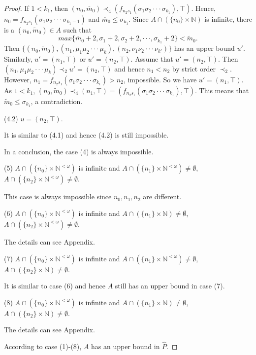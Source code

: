 \documentclass[10pt,a4paper]{amsart}
\begin{document}
\begin{proof}
If $1<k_{1}$, then $(n_{0},\overline{m}_{0})\prec_{4}(f_{n_{2}s_{1}}(\sigma_{1}\sigma_{2}\cdot\cdot\cdot\sigma_{k_{1}}),\top)$. Hence, $n_{0}=f_{n_{2}s_{1}}(\sigma_{1}\sigma_{2}\cdot\cdot\cdot\sigma_{k_{1}-1})$ and $\overline{m}_{0}\leq\sigma_{k_{1}}$. Since $A\cap(\{n_{0}\}\times\mathbb{N})$ is infinite, there is a $(n_{0},\widetilde{m}_{0})\in A$ such that $$max\{\overline{m}_{0}+2,\sigma_{1}+2,\sigma_{2}+2,\cdot\cdot\cdot,\sigma_{k_{1}}+2\}<\widetilde{m}_{0}.$$
Then $\{(n_{0},\widetilde{m}_{0}),(n_{1},\mu_{1}\mu_{2}\cdot\cdot\cdot\mu_{k}),(n_{2},\nu_{1}\nu_{2}\cdot\cdot\cdot\nu_{k'})\}$ has an upper bound $u'$. Similarly, $u'=(n_{1},\top)$ or $u'=(n_{2},\top)$. Assume that $u'=(n_{2},\top)$. Then $(n_{1},\mu_{1}\mu_{2}\cdot\cdot\cdot\mu_{k})\prec_{2}u'=(n_{2},\top)$ and hence $n_{1}< n_{2}$ by strict order $\prec_{2}$. However, $n_{1}=f_{n_{2}s_{1}}(\sigma_{1}\sigma_{2}\cdot\cdot\cdot\sigma_{k_{1}})>n_{2}$, impossible. So we have $u'=(n_{1},\top)$. As $1<k_{1}$, $(n_{0},\widetilde{m}_{0})\prec_{4}(n_{1},\top)=(f_{n_{2}s_{1}}(\sigma_{1}\sigma_{2}\cdot\cdot\cdot\sigma_{k_{1}}),\top)$. This means that $\widetilde{m}_{0}\leq\sigma_{k_{1}}$, a contradiction.

(4.2) $u=(n_{2},\top)$.

It is similar to (4.1) and hence (4.2) is still impossible.

In a conclusion, the case (4) is always impossible.

(5) $A\cap(\{n_{0}\}\times\mathbb{N}^{<\omega})$ is infinite and $A\cap(\{n_{1}\}\times\mathbb{N}^{<\omega})\neq\emptyset$, $A\cap(\{n_{2}\}\times\mathbb{N}^{<\omega})\neq\emptyset$.

This case is always impossible since $n_{0},n_{1},n_{2}$ are different.

(6) $A\cap(\{n_{0}\}\times\mathbb{N}^{<\omega})$ is infinite and $A\cap(\{n_{1}\}\times\mathbb{N})\neq\emptyset$, $A\cap(\{n_{2}\}\times\mathbb{N}^{<\omega})\neq\emptyset$.

The details can see Appendix.


(7) $A\cap(\{n_{0}\}\times\mathbb{N}^{<\omega})$ is infinite and $A\cap(\{n_{1}\}\times\mathbb{N}^{<\omega})\neq\emptyset$, $A\cap(\{n_{2}\}\times\mathbb{N})\neq\emptyset$.

It is similar to case (6) and hence $A$ still has an upper bound in case (7).

(8) $A\cap(\{n_{0}\}\times\mathbb{N}^{<\omega})$ is infinite and $A\cap(\{n_{1}\}\times\mathbb{N})\neq\emptyset$, $A\cap(\{n_{2}\}\times\mathbb{N})\neq\emptyset$.

The details can see Appendix.

According to case (1)-(8), $A$ has an upper bound in $\widehat{P}$.\end{proof}
\end{document}
